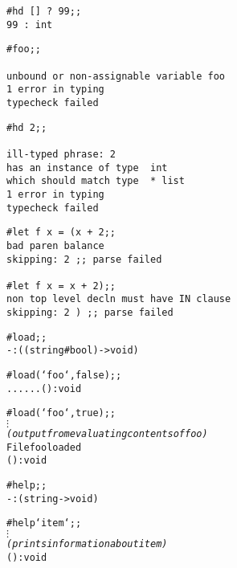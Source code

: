 \begin{session}\begin{verbatim}
#hd [] ? 99;;
99 : int
\end{verbatim}\end{session}


\begin{session}\begin{verbatim}
#foo;;

unbound or non-assignable variable foo
1 error in typing
typecheck failed     
\end{verbatim}\end{session}

\begin{session}\begin{verbatim}
#hd 2;;

ill-typed phrase: 2
has an instance of type  int
which should match type  * list
1 error in typing
typecheck failed     
\end{verbatim}\end{session}

\begin{session}\begin{verbatim}
#let f x = (x + 2;;
bad paren balance
skipping: 2 ;; parse failed     

#let f x = x + 2);;
non top level decln must have IN clause
skipping: 2 ) ;; parse failed     
\end{verbatim}\end{session}





\begin{session}\begin{alltt}
#load;;
- : ((string # bool) -> void)

#load(`foo`, false);;
......() : void

#load(`foo`,true);;
      \(\vdots\)   
   {\it (output from evaluating contents of{\tt foo})}
File foo loaded
() : void
\end{alltt}\end{session}

\begin{session}\begin{alltt}
#help;;
- : (string -> void)

#help `item`;;
      \(\vdots\)
   {\it (prints information about{\tt item})}
() : void
\end{alltt}\end{session}

